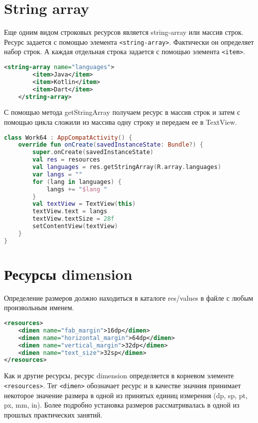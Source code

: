 \section{String array}
Еще одним видом строковых ресурсов является string-array или массив строк.
Ресурс задается с помощью элемента \texttt{<string-array>}. Фактически он
определяет набор строк. А каждая отдельная строка задается с помощью
элемента \texttt{<item>}.
\begin{lstlisting}[language=xml, caption=\leftline{Объявление ресурсов string array}, label=lst:xml:array]
<string-array name="languages">
        <item>Java</item>
        <item>Kotlin</item>
        <item>Dart</item>
    </string-array>
\end{lstlisting}

С помощью метода getStringArray получаем ресурс в массив строк и затем с
помощью цикла сложили из массива одну строку и передаем ее в TextView.

\begin{lstlisting}[language=Kotlin, caption=\leftline{Использование ресурсов string array в в коде}, label=lst:kot:array]
class Work64 : AppCompatActivity() {
    override fun onCreate(savedInstanceState: Bundle?) {
        super.onCreate(savedInstanceState)
        val res = resources
        val languages = res.getStringArray(R.array.languages)
        var langs = ""
        for (lang in languages) {
            langs += "$lang "
        }
        val textView = TextView(this)
        textView.text = langs
        textView.textSize = 28f
        setContentView(textView)
    }
}
\end{lstlisting}

\section{Ресурсы dimension}
Определение размеров должно находиться в каталоге res/values в файле с
любым произвольным именем.

\begin{lstlisting}[language=xml, caption=\leftline{Объявление ресурсов dimension}, label=lst:xml:dimension]
<resources>
    <dimen name="fab_margin">16dp</dimen>
    <dimen name="horizontal_margin">64dp</dimen>
    <dimen name="vertical_margin">32dp</dimen>
    <dimen name="text_size">32sp</dimen>
</resources>
\end{lstlisting}

Как и другие ресурсы, ресурс dimension определяется в корневом элементе
\texttt{<resources>}. Тег \texttt{<dimen>} обозначает ресурс и в качестве
значния принимает некоторое значение размера в одной из принятых единиц
измерения (dp, sp, pt, px, mm, in). Более подробно установка размеров
рассматривалась в одной из прошлых практических занятий.\par

